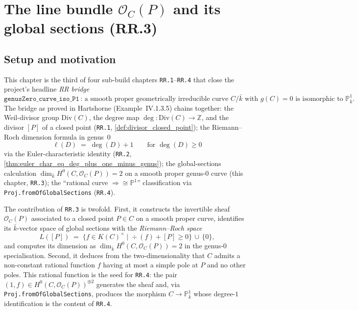 
\chapter{The line bundle \(\mathcal O_C(P)\) and its global sections (RR.3)}
\label{chap:RiemannRoch_OCofP}


\section{Setup and motivation}

This chapter is the third of four sub-build chapters \texttt{RR.1}--\texttt{RR.4}
that close the project's headline \emph{RR bridge}
\[
  \mathtt{genusZero\_curve\_iso\_P1}
  \,\colon\,
  \text{a smooth proper geometrically irreducible curve \(C / \bar k\) with
  \(g(C) = 0\) is isomorphic to \(\mathbb P^1_{\bar k}\).}
\]
The bridge as proved in Hartshorne (Example~IV.1.3.5) chains together:
the Weil-divisor group \(\mathrm{Div}(C)\), the degree map $\deg \colon \mathrm{Div}(C)
\to \mathbb Z$, and the divisor $[P]$ of a closed point
(\texttt{RR.1}, \cref{def:divisor_closed_point}); the Riemann--Roch
dimension formula in genus~\(0\)
\[
  \ell(D) \;=\; \deg(D) + 1 \qquad \text{for } \deg(D) \geq 0
\]
via the Euler-characteristic identity
(\texttt{RR.2}, \cref{thm:euler_char_eq_deg_plus_one_minus_genus}); the global-sections
calculation \(\dim_{\bar k} H^0(C, \mathcal O_C(P)) = 2\) on a smooth
proper genus-\(0\) curve (this chapter, \texttt{RR.3}); the
``rational curve \(\Rightarrow \cong \mathbb P^1\)'' classification via
\texttt{Proj.fromOfGlobalSections} (\texttt{RR.4}).

The contribution of \texttt{RR.3} is twofold. First, it constructs the
invertible sheaf \(\mathcal O_C(P)\) associated to a closed point \(P \in C\)
on a smooth proper curve, identifies its \(\bar k\)-vector space of global
sections with the \emph{Riemann--Roch space}
\[
  L([P]) \;=\;
  \bigl\{f \in K(C)^{\times} \;\big|\; \div(f) + [P] \geq 0\bigr\}
  \,\cup\, \{0\},
\]
and computes its dimension as \(\dim_{\bar k} H^0(C, \mathcal O_C(P)) = 2\)
in the genus-\(0\) specialisation. Second, it deduces from the
two-dimensionality that \(C\) admits a non-constant rational function \(f\)
having at most a simple pole at \(P\) and no other poles. This rational
function is the seed for \texttt{RR.4}: the pair $(1, f) \in
H^0(C, \mathcal O_C(P))^{\oplus 2}$ generates the sheaf and, via
\texttt{Proj.fromOfGlobalSections}, produces the morphism
\(C \to \mathbb P^1_{\bar k}\) whose degree-\(1\) identification is the
content of \texttt{RR.4}.

